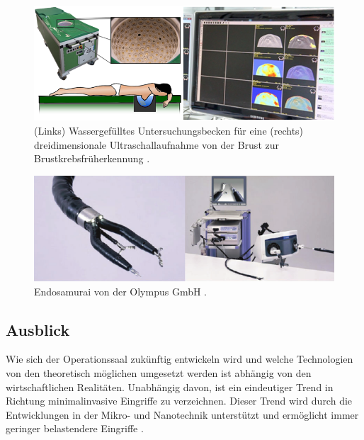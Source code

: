 \begin{figure} [H]
	\includegraphics[scale = 0.5]{Content/Pictures/us.png}
	\caption{(Links) Wassergefülltes Untersuchungsbecken für eine (rechts) dreidimensionale Ultraschallaufnahme von der Brust zur Brustkrebsfrüherkennung \cite{Ultraschall}.} 
	\label{fig:us}
\end{figure}

\begin{figure} [H]
	\includegraphics[scale = 0.7]{Content/Pictures/endosamurai.png}
	\caption{Endosamurai von der Olympus GmbH \cite{EndosamuraiBild}.} 
	\label{fig:endosamurai}
\end{figure}

\subsection{Ausblick}
Wie sich der Operationssaal zukünftig entwickeln wird und welche Technologien von den theoretisch möglichen umgesetzt werden ist abhängig von den wirtschaftlichen Realitäten. Unabhängig davon, ist ein eindeutiger Trend in Richtung minimalinvasive Eingriffe zu verzeichnen. Dieser Trend wird durch die Entwicklungen in der Mikro- und Nanotechnik unterstützt und ermöglicht immer geringer belastendere Eingriffe \cite{DerDigitaleOperationssaal}. 


